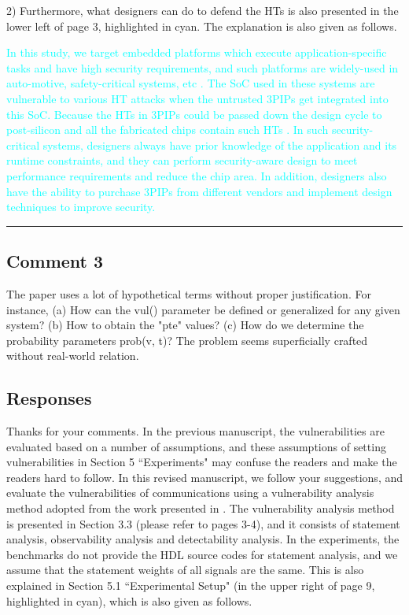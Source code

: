 \documentclass[10pt,journal, compsoc]{IEEEtran}
\begin{document}
\vspace{0.5em}
2) Furthermore, what designers can do to defend the HTs is also presented in the lower left of page 3, highlighted in cyan. The explanation is also given as follows.

\textcolor{cyan}{In this study, we target embedded platforms which execute application-specific tasks and have high security requirements, and such platforms are widely-used in auto-motive, safety-critical systems, etc \cite{article:YS}. The SoC used in these systems are vulnerable to various HT attacks when the untrusted 3PIPs get integrated into this SoC. Because the HTs in 3PIPs could be passed down the design cycle to post-silicon and all the fabricated chips contain such HTs \cite{article:NP}. In such security-critical systems, designers always have prior knowledge of the application and its runtime constraints, and they can perform security-aware design to meet performance requirements and reduce the chip area. In addition, designers also have the ability to purchase 3PIPs from different vendors and implement design techniques to improve security.}


\noindent\rule[0.25\baselineskip]{252pt}{1pt}

\subsection*{Comment 3}
The paper uses a lot of hypothetical terms without proper justification. For instance, (a) How can the vul() parameter be defined or generalized for any given system? (b) How to obtain the "pte" values? (c) How do we determine the probability parameters prob(v, t)? The problem seems superficially crafted without real-world relation.

\subsection*{Responses}
Thanks for your comments. In the previous manuscript, the vulnerabilities are evaluated based on a number of assumptions, and these assumptions of setting vulnerabilities in Section 5 ``Experiments" may confuse the readers and make the readers hard to follow. In this revised manuscript, we follow your suggestions, and evaluate the vulnerabilities of communications using a vulnerability analysis method adopted from the work presented in \cite{conference:HS}. The vulnerability analysis method is presented in Section 3.3 (please refer to pages 3-4), and it consists of statement analysis, observability analysis and detectability analysis. In the experiments, the benchmarks do not provide the HDL source codes for statement analysis, and we assume that the statement weights of all signals are the same. This is also explained in Section 5.1 ``Experimental Setup" (in the upper right of page 9, highlighted in cyan), which is also given as follows.
\end{document}
